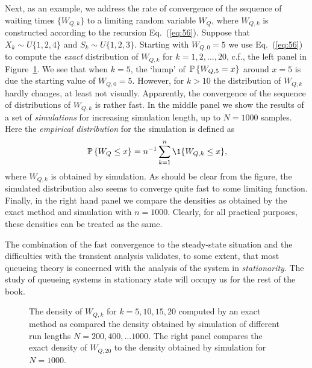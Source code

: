 Next, as an example, we address the rate of convergence of the
sequence of waiting times $\{W_{Q,k}\}$ to a limiting random variable
$W_Q$, where $W_{Q,k}$ is constructed according to the recursion
Eq.~(\ref{eq:56}). Suppose that $X_k\sim U\{1,2,4\}$ and
$S_k\sim U\{1,2,3\}$.  Starting with $W_{Q,0}=5$ we use
Eq.~(\ref{eq:56}) to compute the \emph{exact} distribution of
$W_{Q,k}$ for $k=1,2,\ldots, 20$, c.f., the left panel in
Figure~\ref{fig:convergence}. We see that when $k=5$, the `hump' of
$\P{W_{Q,5}=x}$ around $x=5$ is due the starting value of
$W_{Q,0}=5$. However, for $k>10$ the distribution of $W_{Q,k}$ hardly
changes, at least not visually. Apparently, the convergence of the
sequence of distributions of $W_{Q,k}$ is rather fast. In the middle
panel we show the results of a set of \emph{simulations} for
increasing simulation length, up to $N=1000$ samples. Here the \emph{empirical distribution} for the simulation is defined as
\begin{equation*}
\P{W_Q\leq x} =   n^{-1}\sum_{k=1}^n \1{W_{Q,k} \leq x},
\end{equation*}
where $W_{Q,k}$ is obtained by simulation. As should be clear from the
figure, the simulated distribution also seems to converge quite fast to
some limiting function. Finally, in the right hand panel we compare
the densities as obtained by the exact method and simulation with
$n=1000$. Clearly, for all practical purposes, these densities can be
treated as the same.

The combination of the fast convergence to the steady-state situation
and the difficulties with the transient analysis validates, to some
extent, that most queueing theory is concerned with the analysis of
the system in \emph{stationarity}. The study of queueing systems in
stationary state will occupy us for the rest of the book.

\begin{figure}
  \centering



  \caption{The density of $W_{Q,k}$ for $k=5, 10, 15, 20$ computed by
    an exact method as compared the density obtained by simulation of
    different run lengths $N=200, 400, \ldots 1000$. The right panel
    compares the exact density of $W_{Q,20}$ to the density obtained by simulation
    for $N=1000$.}
\label{fig:convergence}
\end{figure}

